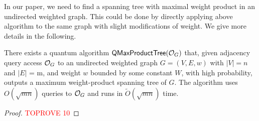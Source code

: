 \documentclass[11pt]{article}
\newcommand{\abss}[1]{\left\lvert #1 \right\rvert}
\begin{document}
{In our paper, we need to find a spanning tree
with maximal weight product 
in an undirected weighted graph.
This could
be done by directly applying above algorithm
to the same graph with 
slight modifications of weight.
We give more details in the following.

\begin{corollary}\label{cor:max-weight-spanning-tree-finding}
  There exists a quantum algorithm $\mathsf{QMaxProductTree}(\mathcal{O}_{G})$ that, given adjacency
  query access $\mathcal{O}_{G}$ to an undirected weighted graph $G = (V, E, w)$ with
  $\abss{V} = n$ and $\abss{E}$ = m, and weight $w$ bounded
  by some constant $W$, 
  with high probability, outputs a maximum weight-product
  spanning tree of $G$.
  The algorithm uses $O(\sqrt{mn})$ queries to $\mathcal{O}_{G}$ and runs in
  $\widetilde{O} (\sqrt{mn})$ time.
\end{corollary}

\begin{proof}\textcolor{red}{TOPROVE 10}\end{proof}

}
\end{document}
